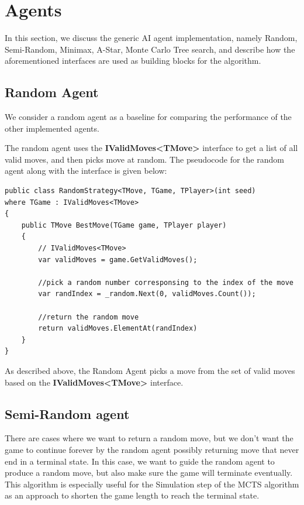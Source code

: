 \section{Agents}

In this section, we discuss the generic \gls{AI} agent implementation, namely Random, Semi-Random, Minimax, A-Star, Monte Carlo Tree search, and describe how the aforementioned interfaces are used as building blocks for the algorithm.

\subsection{Random Agent}
We consider a random agent as a baseline for comparing the performance of the other implemented agents. 

The random agent uses the \textbf{IValidMoves\textless{}TMove\textgreater{}} interface to get a list of all valid moves, and then picks move at random. The pseudocode for the random agent along with the interface is given below:

\begin{lstlisting}
public class RandomStrategy<TMove, TGame, TPlayer>(int seed)
where TGame : IValidMoves<TMove>
{    
    public TMove BestMove(TGame game, TPlayer player)
    {
        // IValidMoves<TMove>
        var validMoves = game.GetValidMoves();

        //pick a random number corresponsing to the index of the move
        var randIndex = _random.Next(0, validMoves.Count());

        //return the random move
        return validMoves.ElementAt(randIndex)
    }
}
\end{lstlisting}

As described above, the Random Agent picks a move from the set of valid moves based on the \textbf{IValidMoves\textless{}TMove\textgreater{}} interface.

\subsection{Semi-Random agent}

There are cases where we want to return a random move, but we don't want the game to continue forever by the random agent possibly returning move that never end in a terminal state. In this case, we want to guide the random agent to produce a random move, but also make sure the game will terminate eventually. This algorithm is especially useful for the Simulation step of the \gls{MCTS} algorithm as an approach to shorten the game length to reach the terminal state.

